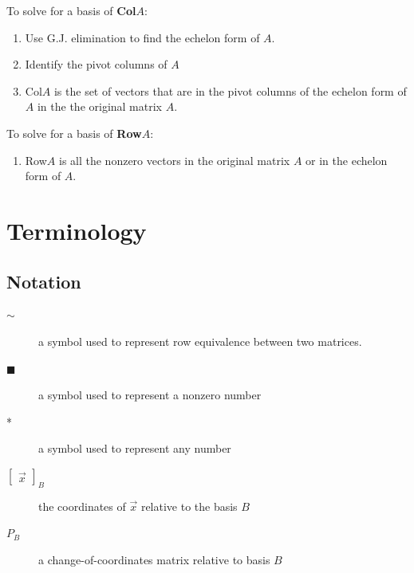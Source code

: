 \documentclass[a4paper,12pt]{article}
\theoremstyle{definition}
\theoremstyle{definition}
\newcommand{\basiscoord}[2]{
	\begin{bmatrix}
		\vec{#1}
	\end{bmatrix}_#2
}
\begin{document}
	To solve for a basis of \textbf{Col}$A$:
	\begin{enumerate}
		\item Use G.J. elimination to find the echelon form of $A$.
		
		\item Identify the pivot columns of $A$
		
		\item Col$A$ is the set of vectors that are in the pivot columns of the echelon form of $A$ in the the original matrix $A$.
	\end{enumerate}
	
	To solve for a basis of \textbf{Row}$A$:
	\begin{enumerate}
		\item Row$A$ is all the nonzero vectors in the original matrix $A$ or in the echelon form of $A$.
	\end{enumerate}
	\newpage
	
	\section{Terminology}
	\subsection{Notation}
	\begin{description}
		\item[$\sim$] a symbol used to represent row equivalence between two matrices.
		
		\item[$\blacksquare$] a symbol used to represent a nonzero number
		
		\item[*] a symbol used to represent any number
		
		\item[$\basiscoord{x}{B}$] the coordinates of $\vec{x}$ relative to the basis $B$
		
		\item[$P_B$] a change-of-coordinates matrix relative to basis $B$
	\end{description}
	
\end{document}
